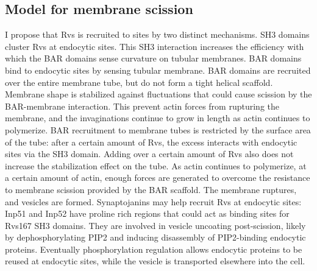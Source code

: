\documentclass[9pt,lineno]{elife}
\begin{document}
\subsection{Model for membrane scission}
I propose that Rvs is recruited to sites by two distinct mechanisms. SH3 domains cluster Rvs at endocytic sites. This SH3 interaction increases the efficiency with which the BAR domains sense curvature on tubular membranes. BAR domains bind to endocytic sites by sensing tubular membrane. BAR domains are recruited over the entire membrane tube, but do not form a tight helical scaffold. Membrane shape is stabilized against fluctuations that could cause scission by the BAR-membrane interaction. This prevent actin forces from rupturing the membrane, and the invaginations continue to grow in length as actin continues to polymerize. BAR recruitment to membrane tubes is restricted by the surface area of the tube: after a certain amount of Rvs, the excess interacts with endocytic sites via the SH3 domain. Adding over a certain amount of Rvs also does not increase the stabilization effect on the tube. As actin continues to polymerize, at a certain amount of actin, enough forces are generated to overcome the resistance to membrane scission provided by the BAR scaffold. The membrane ruptures, and vesicles are formed. Synaptojanins may help recruit Rvs at endocytic sites: Inp51 and Inp52 have proline rich regions that could act as binding sites for Rvs167 SH3 domains. They are involved in vesicle uncoating post-scission, likely by dephosphorylating PIP2 and inducing disassembly of PIP2-binding endocytic proteins. Eventually phosphorylation regulation allows endocytic proteins to be reused at endocytic sites, while the vesicle is transported elsewhere into the cell.
\end{document}
